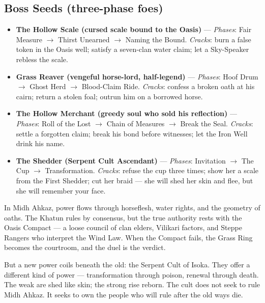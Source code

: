 {{\subsection*{Boss Seeds (three-phase foes)}
\begin{itemize}
\item \textbf{The Hollow Scale (cursed scale bound to the Oasis)} --- \emph{Phases}: Fair Measure $\rightarrow$ Thirst Unearned $\rightarrow$ Naming the Bound. \emph{Cracks}: burn a false token in the Oasis well; satisfy a seven-clan water claim; let a Sky-Speaker rebless the scale.
\item \textbf{Grass Reaver (vengeful horse-lord, half-legend)} --- \emph{Phases}: Hoof Drum $\rightarrow$ Ghost Herd $\rightarrow$ Blood-Claim Ride. \emph{Cracks}: confess a broken oath at his cairn; return a stolen foal; outrun him on a borrowed horse.
\item \textbf{The Hollow Merchant (greedy soul who sold his reflection)} --- \emph{Phases}: Roll of the Lost $\rightarrow$ Chain of Measures $\rightarrow$ Break the Seal. \emph{Cracks}: settle a forgotten claim; break his bond before witnesses; let the Iron Well drink his name.
\item \textbf{The Shedder (Serpent Cult Ascendant)} --- \emph{Phases}: Invitation $\rightarrow$ The Cup $\rightarrow$ Transformation. \emph{Cracks}: refuse the cup three times; show her a scale from the First Shedder; cut her braid --- she will shed her skin and flee, but she will remember your face.
\end{itemize}

\begin{tcolorbox}[colback=black!3,colframe=black!40!white,title={Patronage \& Power in Midh Ahkaz},breakable]
In Midh Ahkaz, power flows through horseflesh, water rights, and the geometry of oaths. The Khatun rules by consensus, but the true authority rests with the Oasis Compact --- a loose council of clan elders, Vilikari factors, and Steppe Rangers who interpret the Wind Law. When the Compact fails, the Grass Ring becomes the courtroom, and the duel is the verdict.

But a new power coils beneath the old: the Serpent Cult of Isoka. They offer a different kind of power --- transformation through poison, renewal through death. The weak are shed like skin; the strong rise reborn. The cult does not seek to rule Midh Ahkaz. It seeks to own the people who will rule after the old ways die.


\end{tcolorbox}}}
